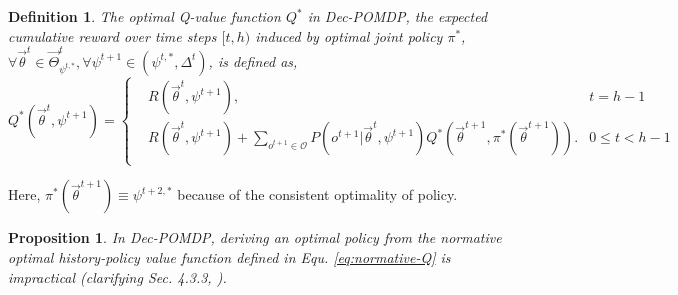 \documentclass{article} %
\newcommand{\obshist}{\vec{\theta}}
\newtheorem{definition}{Definition}
\newtheorem{proposition}{Proposition}
\begin{document}
\begin{definition} \label{defn:normative-Q}
    The optimal Q-value function $Q^*$ in Dec-POMDP, the expected cumulative reward over time steps $[t,h)$ induced by optimal joint policy $\pi^{*}$, $\forall \obshist^t\in \vec{\Theta}^t_{\psi^{t, *}}, \forall \psi^{t+1}\in(\psi^{t, *},\Delta^t)$, is defined as,
    \begin{equation}
        Q^*(\obshist^t, \psi^{t+1}) = \left\{
        \begin{aligned}
        &R(\obshist^t, \psi^{t+1}), &t=h-1 \\ 
        &R(\obshist^t, \psi^{t+1}) + \sum_{o^{t+1} \in \mathcal{O}} P(o^{t+1}|\obshist^t, \psi^{t+1}) Q^*(\obshist^{t+1}, \pi^*(\obshist^{t+1})). &0\leqslant t < h-1 \\
        \end{aligned}
        \right .\label{eq:normative-Q}
    \end{equation}
\end{definition}
Here, $\pi^*(\obshist^{t+1})\equiv \psi^{t+2, *}$ because of the consistent optimality of policy.

\begin{proposition} \label{prop:problem}
    In Dec-POMDP, deriving an optimal policy from the normative optimal history-policy value function defined in Equ. \ref{eq:normative-Q} is impractical (clarifying Sec. 4.3.3, \cite{Oliehoek08JAIR}).
\end{proposition}
\end{document}
